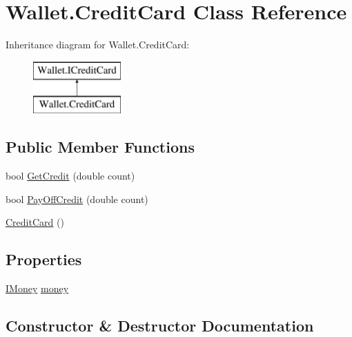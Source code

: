 \hypertarget{class_wallet_1_1_credit_card}{}\section{Wallet.\+Credit\+Card Class Reference}
\label{class_wallet_1_1_credit_card}
Inheritance diagram for Wallet.\+Credit\+Card\+:\begin{figure}[H]
\begin{center}
\leavevmode
\includegraphics[height=2.000000cm]{class_wallet_1_1_credit_card}
\end{center}
\end{figure}
\subsection*{Public Member Functions}
\begin{DoxyCompactItemize}
\item 
bool \hyperlink{class_wallet_1_1_credit_card_a8907e7f7d9b2fcdf0fa84f0a76bc2b82}{Get\+Credit} (double count)
\item 
bool \hyperlink{class_wallet_1_1_credit_card_a44cebe9c7bd0b962656364d80899b59e}{Pay\+Off\+Credit} (double count)
\item 
\hyperlink{class_wallet_1_1_credit_card_ae913ee76054159c7bb57399d3398a793}{Credit\+Card} ()
\end{DoxyCompactItemize}
\subsection*{Properties}
\begin{DoxyCompactItemize}
\item 
\hyperlink{interface_wallet_1_1_i_money}{I\+Money} \hyperlink{class_wallet_1_1_credit_card_a849874792e92f41ee08da2ee2045aa55}{money}
\end{DoxyCompactItemize}


\subsection{Constructor \& Destructor Documentation}
\hypertarget{class_wallet_1_1_credit_card_ae913ee76054159c7bb57399d3398a793}{}\label{class_wallet_1_1_credit_card_ae913ee76054159c7bb57399d3398a793} 
